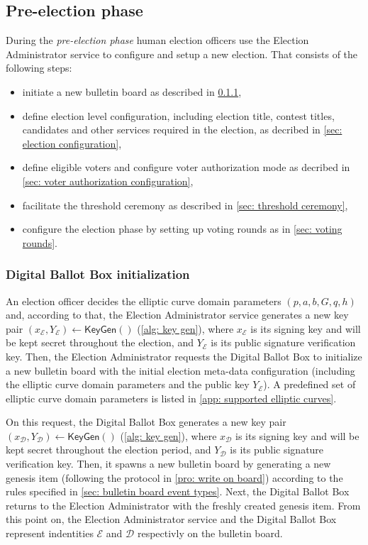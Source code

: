 \subsection{Pre-election phase} \label{sec: pre-election phase}
During the \textit{pre-election phase} human election officers use the Election Administrator service to configure and setup a new election. That consists of the following steps:
\begin{itemize}
    \item initiate a new bulletin board as described in \cref{sec: digital ballot box initialization},
    \item define election level configuration, including election title, contest titles, candidates and other services required in the election, as decribed in \cref{sec: election configuration},
    \item define eligible voters and configure voter authorization mode as decribed in \cref{sec: voter authorization configuration},
    \item facilitate the threshold ceremony as described in \cref{sec: threshold ceremony},
    \item configure the election phase by setting up voting rounds as in \cref{sec: voting rounds}.
\end{itemize}


\subsubsection{Digital Ballot Box initialization} \label{sec: digital ballot box initialization}
An election officer decides the elliptic curve domain parameters $(p, a, b, G, q, h)$ and, according to that, the Election Administrator service generates a new key pair $(x_\mathcal{E}, Y_\mathcal{E}) \gets \mathsf{KeyGen}()$ (\cref{alg: key gen}), where $x_\mathcal{E}$ is its signing key and will be kept secret throughout the election, and $Y_\mathcal{E}$ is its public signature verification key. Then, the Election Administrator requests the Digital Ballot Box to initialize a new bulletin board with the initial election meta-data configuration (including the elliptic curve domain parameters and the public key $Y_\mathcal{E}$). A predefined set of elliptic curve domain parameters is listed in \cref{app: supported elliptic curves}.

On this request, the Digital Ballot Box generates a new key pair $(x_\mathcal{D}, Y_\mathcal{D}) \gets \mathsf{KeyGen}()$ (\cref{alg: key gen}), where $x_\mathcal{D}$ is its signing key and will be kept secret throughout the election period, and $Y_\mathcal{D}$ is its public signature verification key. Then, it spawns a new bulletin board by generating a new genesis item (following the protocol in \cref{pro: write on board}) according to the rules specified in \cref{sec: bulletin board event types}. Next, the Digital Ballot Box returns to the Election Administrator with the freshly created genesis item. From this point on, the Election Administrator service and the Digital Ballot Box represent indentities $\mathcal{E}$ and $\mathcal{D}$ respectivly on the bulletin board.


